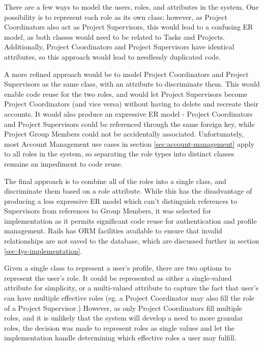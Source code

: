 \documentclass[document.tex]{subfiles}
\begin{document}
There are a few ways to model the users, roles, and attributes in the system. One possibility is to represent each role as its own class; however, as Project Coordinators also act as Project Supervisors, this would lead to a confusing ER model, as both classes would need to be related to Tasks and Projects. Additionally, Project Coordinators and Project Supervisors have identical attributes, so this approach would lead to needlessly duplicated code.

A more refined approach would be to model Project Coordinators and Project Supervisors as the same class, with an attribute to discriminate them. This would enable code reuse for the two roles, and would let Project Supervisors become Project Coordinators (and vice versa) without having to delete and recreate their accounts. It would also produce an expressive ER model - Project Coordinators and Project Supervisors could be referenced through the same foreign key, while Project Group Members could not be accidentally associated. Unfortunately, most Account Management use cases in section \ref{sec:account-management} apply to all roles in the system, so separating the role types into distinct classes remains an impediment to code reuse.

The final approach is to combine all of the roles into a single class, and discriminate them based on a role attribute. While this has the disadvantage of producing a less expressive ER model which can’t distinguish references to Supervisors from references to Group Members, it was selected for implementation as it permits significant code reuse for authentication and profile management. Rails has ORM facilities available to ensure that invalid relationships are not saved to the database, which are discussed further in section \ref{sec:4ys-implementation}.

Given a single class to represent a user’s profile, there are two options to represent the user’s role. It could be represented as either a single-valued attribute for simplicity, or a multi-valued attribute to capture the fact that user’s can have multiple effective roles (eg. a Project Coordinator may also fill the role of a Project Supervisor.) However, as only Project Coordinators fill multiple roles, and it is unlikely that the system will develop a need to more granular roles, the decision was made to represent roles as single values and let the implementation handle determining which effective roles a user may fulfill.


\FloatBarrier
\end{document}
